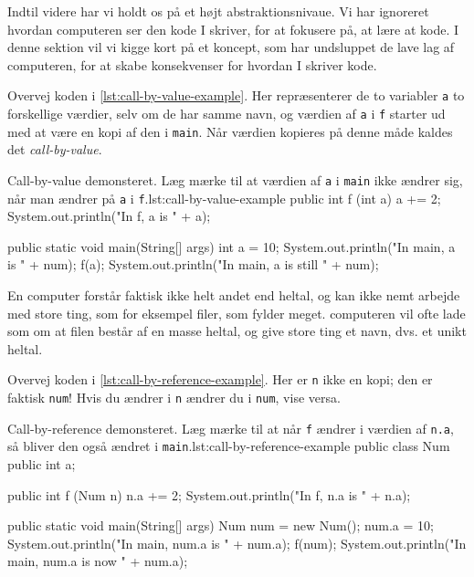 
        Indtil videre har vi holdt os på et højt abstraktionsnivaue.
        Vi har ignoreret hvordan computeren ser den kode I skriver,
        for at fokusere på, at lære at kode. I denne sektion vil vi
        kigge kort på et koncept, som har undsluppet de lave lag af
        computeren, for at skabe konsekvenser for hvordan I skriver
        kode.

        Overvej koden i \autoref{lst:call-by-value-example}. Her
        repræsenterer de to variabler \texttt{a} to forskellige værdier,
        selv om de har samme navn, og værdien af \texttt{a} i \texttt{f}
        starter ud med at være en kopi af den i \texttt{main}. Når
        værdien kopieres på denne måde kaldes det
        \emph{call-by-value}.

        \begin{JavaCode}{Call-by-value demonsteret. Læg mærke til at værdien af \texttt{a} i \texttt{main} ikke ændrer sig, når man ændrer på \texttt{a} i \texttt{f}.}{lst:call-by-value-example}
            public int f (int a) {
                a += 2;
                System.out.println("In f, a is " + a);
            }

            public static void main(String[] args) {
                int a = 10;
                System.out.println("In main, a is " + num);
                f(a);
                System.out.println("In main, a is still " + num);
            }
        \end{JavaCode}

        En computer forstår faktisk ikke helt andet end heltal, og kan
        ikke nemt arbejde med store ting, som for eksempel filer, som
        fylder meget. computeren vil ofte lade som om at filen består
        af en masse heltal, og give store ting et navn, dvs. et unikt
        heltal.

        Overvej koden i \autoref{lst:call-by-reference-example}.
        Her er \texttt{n} ikke en kopi; den er faktisk \texttt{num}! Hvis
        du ændrer i \texttt{n} ændrer du i \texttt{num}, vise versa.

        \begin{JavaCode}{Call-by-reference demonsteret. Læg mærke til at når \texttt{f} ændrer i værdien af \texttt{n.a}, så bliver den også ændret i \texttt{main}.}{lst:call-by-reference-example}
            public class Num {
                public int a;
            }

            public int f (Num n) {
                n.a += 2;
                System.out.println("In f, n.a is " + n.a);
            }

            public static void main(String[] args) {
                Num num = new Num();
                num.a = 10;
                System.out.println("In main, num.a is " + num.a);
                f(num);
                System.out.println("In main, num.a is now " + num.a);
            }
        \end{JavaCode}


